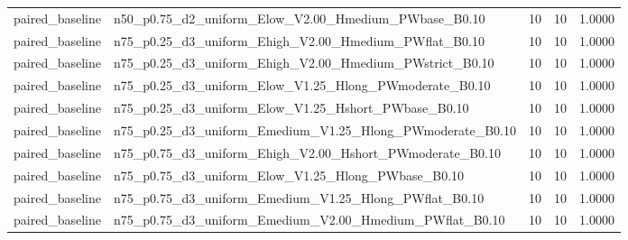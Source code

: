 \begin{tabular}{llrrr}
paired_baseline & n50_p0.75_d2_uniform_Elow_V2.00_Hmedium_PWbase_B0.10 & 10 & 10 & 1.0000 \\
paired_baseline & n75_p0.25_d3_uniform_Ehigh_V2.00_Hmedium_PWflat_B0.10 & 10 & 10 & 1.0000 \\
paired_baseline & n75_p0.25_d3_uniform_Ehigh_V2.00_Hmedium_PWstrict_B0.10 & 10 & 10 & 1.0000 \\
paired_baseline & n75_p0.25_d3_uniform_Elow_V1.25_Hlong_PWmoderate_B0.10 & 10 & 10 & 1.0000 \\
paired_baseline & n75_p0.25_d3_uniform_Elow_V1.25_Hshort_PWbase_B0.10 & 10 & 10 & 1.0000 \\
paired_baseline & n75_p0.25_d3_uniform_Emedium_V1.25_Hlong_PWmoderate_B0.10 & 10 & 10 & 1.0000 \\
paired_baseline & n75_p0.75_d3_uniform_Ehigh_V2.00_Hshort_PWmoderate_B0.10 & 10 & 10 & 1.0000 \\
paired_baseline & n75_p0.75_d3_uniform_Elow_V1.25_Hlong_PWbase_B0.10 & 10 & 10 & 1.0000 \\
paired_baseline & n75_p0.75_d3_uniform_Emedium_V1.25_Hlong_PWflat_B0.10 & 10 & 10 & 1.0000 \\
paired_baseline & n75_p0.75_d3_uniform_Emedium_V2.00_Hmedium_PWflat_B0.10 & 10 & 10 & 1.0000 \\
\bottomrule
\end{tabular}
